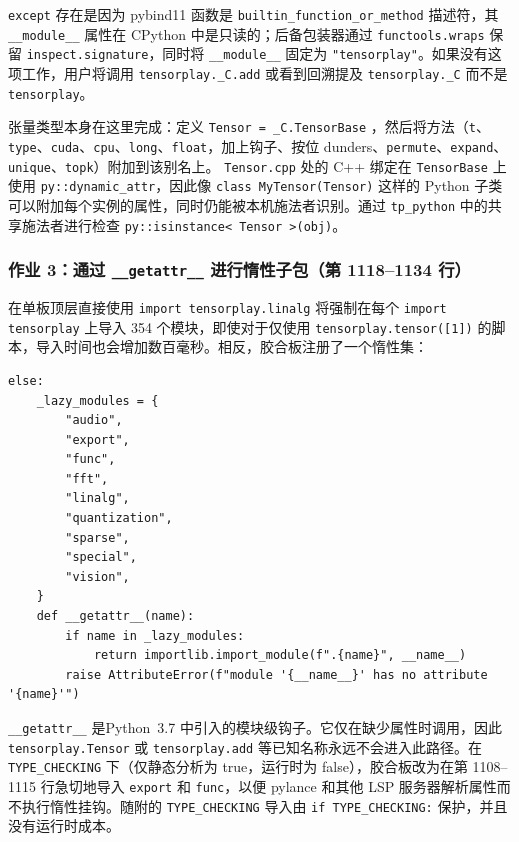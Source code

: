 \texttt{except} 存在是因为 pybind11 函数是 \texttt{builtin\_function\_or\_method} 描述符，其 \texttt{\_\_module\_\_} 属性在 CPython 中是只读的；后备包装器通过 \texttt{functools.wraps} 保留 \texttt{inspect.signature}，同时将 \texttt{\_\_module\_\_} 固定为 \texttt{"tensorplay"}。如果没有这项工作，用户将调用 \texttt{tensorplay.\_C.add} 或看到回溯提及 \texttt{tensorplay.\_C} 而不是 \texttt{tensorplay}。

张量类型本身在这里完成：定义 \texttt{Tensor = \_C.TensorBase} ，然后将方法（\texttt{t}、\texttt{type}、\texttt{cuda}、\texttt{cpu}、\texttt{long}、\texttt{float}，加上钩子、按位 dunders、\texttt{permute}、\texttt{expand}、\texttt{unique}、\texttt{topk}）附加到该别名上。 \texttt{Tensor.cpp} 处的 C++ 绑定在 \texttt{TensorBase} 上使用 \texttt{py::dynamic\_attr}，因此像 \texttt{class MyTensor(Tensor)} 这样的 Python 子类可以附加每个实例的属性，同时仍能被本机施法者识别。通过 \texttt{tp\_python} 中的共享施法者进行检查 \texttt{py::isinstance< Tensor >(obj)}。

\subsubsection{作业 3：通过 \texttt{\_\_getattr\_\_} 进行惰性子包（第 1118--1134 行）}

在单板顶层直接使用 \texttt{import tensorplay.linalg} 将强制在每个 \texttt{import tensorplay} 上导入 354 个模块，即使对于仅使用 \texttt{tensorplay.tensor([1])} 的脚本，导入时间也会增加数百毫秒。相反，胶合板注册了一个惰性集：

\begin{lstlisting}[caption={lazy subpackages.}, label=lst:lazy]
else:
    _lazy_modules = {
        "audio",
        "export",
        "func",
        "fft",
        "linalg",
        "quantization",
        "sparse",
        "special",
        "vision",
    }
    def __getattr__(name):
        if name in _lazy_modules:
            return importlib.import_module(f".{name}", __name__)
        raise AttributeError(f"module '{__name__}' has no attribute '{name}'")
\end{lstlisting}

\texttt{\_\_getattr\_\_} 是Python~3.7 中引入的模块级钩子。它仅在缺少属性时调用，因此 \texttt{tensorplay.Tensor} 或 \texttt{tensorplay.add} 等已知名称永远不会进入此路径。在 \texttt{TYPE\_CHECKING} 下（仅静态分析为 true，运行时为 false），胶合板改为在第 1108--1115 行急切地导入 \texttt{export} 和 \texttt{func}，以便 pylance 和其他 LSP 服务器解析属性而不执行惰性挂钩。随附的 \texttt{TYPE\_CHECKING} 导入由 \texttt{if TYPE\_CHECKING:} 保护，并且没有运行时成本。


